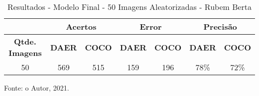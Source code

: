\begin{table}[htp]
\centering
\caption{Resultados - Modelo Final - 50 Imagens Aleatorizadas - Rubem Berta}
\label{tab:daer_rubem_berta}
{%
\begin{tabular}{ccccccc}
\textbf{} & \multicolumn{2}{c}{\textbf{Acertos}} & \multicolumn{2}{c}{\textbf{Error}} & \multicolumn{2}{c}{\textbf{Precisão}} \\ \hline
\textbf{Qtde. Imagens}             & \textbf{DAER}     & \textbf{COCO}    & \textbf{DAER}    & \textbf{COCO}   & \textbf{DAER}     & \textbf{COCO}     \\ \hline
50                     & 569               & 515              & 159              & 196             & 78\%              & 72\%              \\ \hline
\end{tabular}%

Fonte: o Autor, 2021.
}
\end{table}